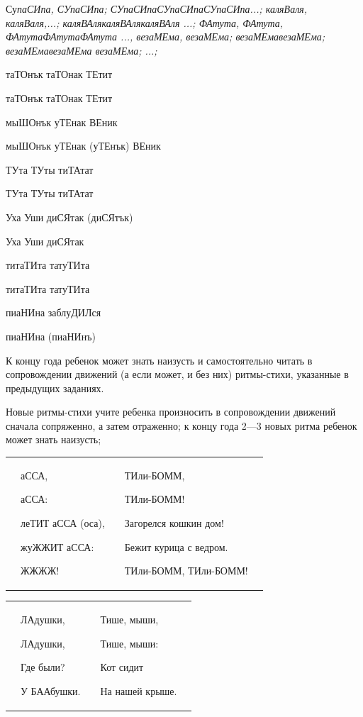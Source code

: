 \documentclass{book}
\renewcommand{\emph}[1]{\textit{#1}}
\begin{document}
Су\emph{паСИпа, СУпаСИпа; СУпаСИпаСУпаСИпаСУпаСИпа...; каляВаля,
каляВаля,...; каляВАлякаляВАлякаляВАля ...; ФАтута, ФАтута,
ФАтутаФАтутаФАтута ..., везаМЕма, везаМЕма; везаМЕмавезаМЕма;
везаМЕмавезаМЕма везаМЕма; ...;}

таТОнък таТОнак ТЕтит

таТОнък таТОнак ТЕтит

мыШОнък уТЕнак ВЕник

мыШОнък уТЕнак (уТЕнък) ВЕник

ТУта ТУты тиТАтат

ТУта ТУты тиТАтат

Уха Уши диСЯтак (диСЯтък)

Уха Уши диСЯтак

титаТИта татуТИта

титаТИта татуТИта

пиаНИна заблуДИЛся

пиаНИна (пиаНИнъ)

К концу года ребенок может знать наизусть и самостоятельно читать в
сопровождении движений (а если может, и без них) ритмы-стихи, указанные
в предыдущих заданиях.

Новые ритмы-стихи учите ребенка произносить в сопровождении движений
сначала сопряженно, а затем отраженно; к концу года 2---3 новых ритма
ребенок может знать наизусть;
{ \centering
\begin{tabular}{p{}p{}p{}p{}p{}}
&аССА, 

аССА: 

леТИТ аССА (оса),

жуЖЖИТ аССА:

ЖЖЖЖ! &&

ТИли-БОММ,

ТИли-БОММ!

Загорелся кошкин дом!

Бежит курица с ведром.

ТИли-БОММ, ТИли-БОММ!&
\end{tabular}
}

{ \centering
\begin{tabular}{p{}p{}p{}p{}p{}}&
ЛАдушки,

ЛАдушки,

Где были?

У БААбушки.&&

Тише, мыши,

Тише, мыши:
 
Кот сидит

На нашей крыше.&
\end{tabular}
}
\end{document}
